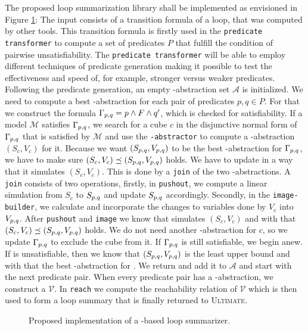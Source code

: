 
The proposed \qvasrs loop summarization library shall be implemented as envisioned in Figure \ref{fig}: The input consists of a transition formula of a loop, that was computed by other tools. This transition formula is firstly used in the \texttt{predicate transformer} to compute a set of predicates $P$ that fulfill the condition of pairwise unsatisfiability. The \texttt{predicate transformer} will be able to employ different techniques of predicate generation making it possible to test the effectiveness and speed of, for example, stronger versus weaker predicates. Following the predicate generation, an empty \qvasr-abstraction set $\mathcal{A}$ is initialized. We need to compute a best \qvasr-abstraction \pqvasr for each pair of predicates $p, q \in P$. For that we construct the formula $\Gamma_{p, q} = p \land F \land q'$, which is checked for satisfiability. If a model $\mathcal{M}$ satisfies $\Gamma_{p, q}$, we search for a cube $c$ in the disjunctive normal form of $\Gamma_{p, q}$ that is satisfied by $\mathcal{M}$ and use the \texttt{\qvasr-abstractor} to compute a \qvasr-abstraction $(S_c, V_c)$ for it. Because we want $(S_{p, q}, V_{p, q})$ to be the best \qvasr-abstraction for $\Gamma_{p, q}$, we have to make sure $(S_c, V_c) \preceq (S_{p, q}, V_{p, q})$ holds. We have to update \pqvasr in a way that it simulates $(S_c, V_c)$. This is done by a \texttt{join} of the two \qvasr-abstractions. A \texttt{join} consists of two operations, firstly, in \texttt{pushout}, we compute a linear simulation from $S_c$ to $S_{p, q}$ and update $S_{p, q}$ accordingly. Secondly, in the \texttt{image-builder}, we calculate and incorporate the changes to variables done by $V_c$ into $V_{p, q}$. After \texttt{pushout} and \texttt{image} we know that \pqvasr simulates $(S_c, V_c)$ and with that $(S_c, V_c) \preceq (S_{p, q}, V_{p, q})$ holds. We do not need another \qvasr-abstraction for $c$, so we update $\Gamma_{p, q}$ to exclude the cube from it. If $\Gamma_{p, q}$ is still satisfiable, we begin anew.
If \pqformula is unsatisfiable, then we know that $(S_{p, q}, V_{p, q})$ is the least upper bound and with that the best \qvasr-abstraction for \pqformula. We return and add it to $\mathcal{A}$ and start with the next predicate pair. When every predicate pair has a \qvasr-abstraction, we construct a \qvasrs $\mathcal{V}$. In \texttt{reach} we compute the reachability relation of $\mathcal{V}$ which is then used to form a loop summary that is finally returned to \textsc{Ultimate}.
\begin{figure}[H]
    
    \caption{Proposed implementation of a \qvasrs-based loop summarizer.}
    \label{fig}
\end{figure}

